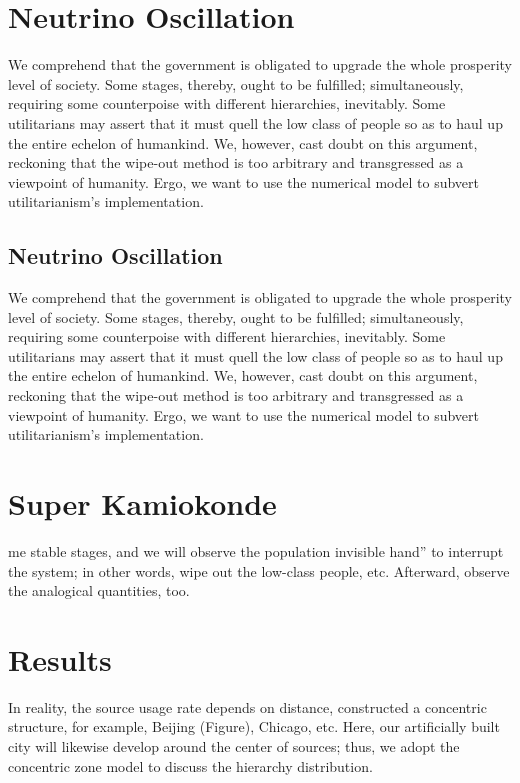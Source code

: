 \documentclass[12pt]{article}
\begin{document}
\setlength{\columnsep}{0.03\textwidth}
\begin{multicols}{2}
    
\section{Neutrino Oscillation}
    We comprehend that the government is obligated to upgrade the whole prosperity level of society. Some stages, thereby, ought to be fulfilled; simultaneously, requiring some counterpoise with different hierarchies, inevitably. Some utilitarians may assert that it must quell the low class of people so as to haul up the entire echelon of humankind. We, however, cast doubt on this argument, reckoning that the wipe-out method is too arbitrary and transgressed as a viewpoint of humanity. Ergo, we want to use the numerical model to subvert utilitarianism's implementation.
    \subsection{Neutrino Oscillation}
    We comprehend that the government is obligated to upgrade the whole prosperity level of society. Some stages, thereby, ought to be fulfilled; simultaneously, requiring some counterpoise with different hierarchies, inevitably. Some utilitarians may assert that it must quell the low class of people so as to haul up the entire echelon of humankind. We, however, cast doubt on this argument, reckoning that the wipe-out method is too arbitrary and transgressed as a viewpoint of humanity. Ergo, we want to use the numerical model to subvert utilitarianism's implementation.
    
\section{Super Kamiokonde}
    me stable stages, and we will observe the population invisible hand” to interrupt the system; in other words, wipe out the low-class people, etc. Afterward, observe the analogical quantities, too.


\section{Results}
    In reality, the source usage rate depends on distance, constructed a concentric structure, for example, Beijing (Figure), Chicago, etc. Here, our artificially built city will likewise develop around the center of sources; thus, we adopt the concentric zone model to discuss the hierarchy distribution.
    

\end{multicols}
\end{document}
